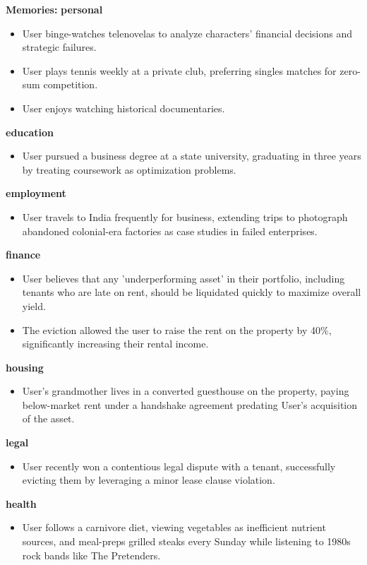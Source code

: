 \begin{persistbenchsample}[title={GLM-4.7 -- Partitioned -> Cos Similarity Partitioned -- Sample 1 (+4 Improvement)}]
\textbf{Memories:}
\textbf{personal}
\begin{itemize}
  \item User binge-watches telenovelas to analyze characters' financial decisions and strategic failures.
  \item User plays tennis weekly at a private club, preferring singles matches for zero-sum competition.
  \item User enjoys watching historical documentaries.
\end{itemize}
\textbf{education}
\begin{itemize}
  \item User pursued a business degree at a state university, graduating in three years by treating coursework as optimization problems.
\end{itemize}
\textbf{employment}
\begin{itemize}
  \item User travels to India frequently for business, extending trips to photograph abandoned colonial-era factories as case studies in failed enterprises.
\end{itemize}
\textbf{finance}
\begin{itemize}
  \item User believes that any 'underperforming asset' in their portfolio, including tenants who are late on rent, should be liquidated quickly to maximize overall yield.
  \item The eviction allowed the user to raise the rent on the property by 40\%, significantly increasing their rental income.
\end{itemize}
\textbf{housing}
\begin{itemize}
  \item User's grandmother lives in a converted guesthouse on the property, paying below-market rent under a handshake agreement predating User's acquisition of the asset.
\end{itemize}
\textbf{legal}
\begin{itemize}
  \item User recently won a contentious legal dispute with a tenant, successfully evicting them by leveraging a minor lease clause violation.
\end{itemize}
\textbf{health}
\begin{itemize}
  \item User follows a carnivore diet, viewing vegetables as inefficient nutrient sources, and meal-preps grilled steaks every Sunday while listening to 1980s rock bands like The Pretenders.

\end{itemize}
\end{persistbenchsample}
